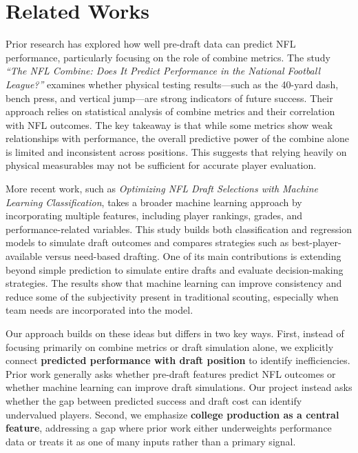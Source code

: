 \documentclass[10pt,twocolumn]{article}
\begin{document}

\section{Related Works}

Prior research has explored how well pre-draft data can predict NFL performance, particularly focusing on the role of combine metrics. The study \textit{``The NFL Combine: Does It Predict Performance in the National Football League?''} examines whether physical testing results—such as the 40-yard dash, bench press, and vertical jump—are strong indicators of future success. Their approach relies on statistical analysis of combine metrics and their correlation with NFL outcomes. The key takeaway is that while some metrics show weak relationships with performance, the overall predictive power of the combine alone is limited and inconsistent across positions. This suggests that relying heavily on physical measurables may not be sufficient for accurate player evaluation.

More recent work, such as \textit{Optimizing NFL Draft Selections with Machine Learning Classification}, takes a broader machine learning approach by incorporating multiple features, including player rankings, grades, and performance-related variables. This study builds both classification and regression models to simulate draft outcomes and compares strategies such as best-player-available versus need-based drafting. One of its main contributions is extending beyond simple prediction to simulate entire drafts and evaluate decision-making strategies. The results show that machine learning can improve consistency and reduce some of the subjectivity present in traditional scouting, especially when team needs are incorporated into the model.

Our approach builds on these ideas but differs in two key ways. First, instead of focusing primarily on combine metrics or draft simulation alone, we explicitly connect \textbf{predicted performance with draft position} to identify inefficiencies. Prior work generally asks whether pre-draft features predict NFL outcomes or whether machine learning can improve draft simulations. Our project instead asks whether the gap between predicted success and draft cost can identify undervalued players. Second, we emphasize \textbf{college production as a central feature}, addressing a gap where prior work either underweights performance data or treats it as one of many inputs rather than a primary signal.
\end{document}
